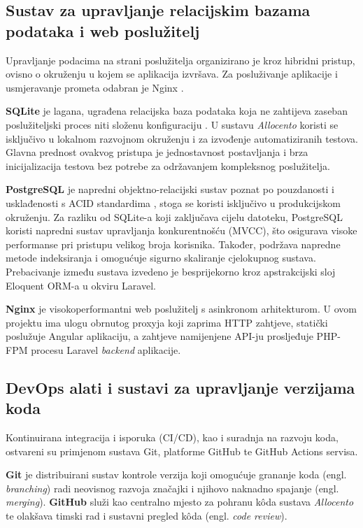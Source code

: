 \documentclass[a4paper,12pt,oneside]{article}
\begin{document}
	\subsection{Sustav za upravljanje relacijskim bazama podataka i web poslužitelj}
	
	Upravljanje podacima na strani poslužitelja organizirano je kroz hibridni pristup, ovisno o okruženju u kojem se aplikacija izvršava. Za posluživanje aplikacije i usmjeravanje prometa odabran je Nginx \cite{w_nginx}.
	
	\textbf{SQLite} je lagana, ugrađena relacijska baza podataka koja ne zahtijeva zaseban poslužiteljski proces niti složenu konfiguraciju \cite{w_sqlite}. U sustavu \textit{Allocento} koristi se isključivo u lokalnom razvojnom okruženju i za izvođenje automatiziranih testova. Glavna prednost ovakvog pristupa je jednostavnost postavljanja i brza inicijalizacija testova bez potrebe za održavanjem kompleksnog poslužitelja.
	
	\textbf{PostgreSQL} je napredni objektno-relacijski sustav poznat po pouzdanosti i usklađenosti s ACID standardima \cite{w_postgresql}, stoga se koristi isključivo u produkcijskom okruženju. Za razliku od SQLite-a koji zaključava cijelu datoteku, PostgreSQL koristi napredni sustav upravljanja konkurentnošću (MVCC), što osigurava visoke performanse pri pristupu velikog broja korisnika. Također, podržava napredne metode indeksiranja i omogućuje sigurno skaliranje cjelokupnog sustava. Prebacivanje između sustava izvedeno je besprijekorno kroz apstrakcijski sloj Eloquent ORM-a u okviru Laravel.
	
	\textbf{Nginx} je visokoperformantni web poslužitelj s asinkronom arhitekturom. U ovom projektu ima ulogu obrnutog proxyja koji zaprima HTTP zahtjeve, statički poslužuje Angular aplikaciju, a zahtjeve namijenjene API-ju prosljeđuje PHP-FPM procesu Laravel \textit{backend} aplikacije.
	
	\subsection{DevOps alati i sustavi za upravljanje verzijama koda}
	
	Kontinuirana integracija i isporuka (CI/CD), kao i suradnja na razvoju koda, ostvareni su primjenom sustava Git, platforme GitHub te GitHub Actions servisa.
	
	\textbf{Git} je distribuirani sustav kontrole verzija koji omogućuje grananje koda (engl. \textit{branching}) radi neovisnog razvoja značajki i njihovo naknadno spajanje (engl. \textit{merging}). \textbf{GitHub} služi kao centralno mjesto za pohranu kôda sustava \textit{Allocento} te olakšava timski rad i sustavni pregled kôda (engl. \textit{code review}).
	
\end{document}
